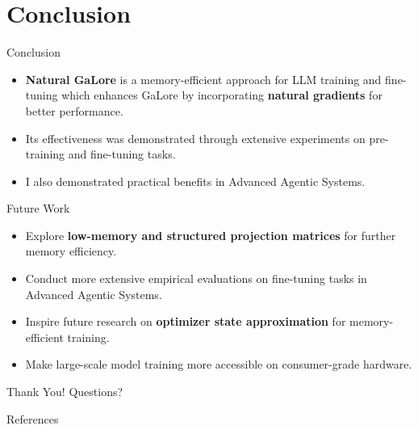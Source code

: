 \documentclass{beamer}
\begin{document}
\section{Conclusion}

\begin{frame}{Conclusion}
    \begin{itemize}
        \item \textbf{Natural GaLore} is a memory-efficient approach for LLM training and fine-tuning which enhances GaLore by incorporating \textbf{natural gradients} for better performance.
        \item Its effectiveness was demonstrated through extensive experiments on pre-training and fine-tuning tasks.
        \item I also demonstrated practical benefits in Advanced Agentic Systems.
    \end{itemize}
\end{frame}

\begin{frame}{Future Work}
    \begin{itemize}
        \item Explore \textbf{low-memory and structured projection matrices} for further memory efficiency.
        \item Conduct more extensive empirical evaluations on fine-tuning tasks in Advanced Agentic Systems.
        \item Inspire future research on \textbf{optimizer state approximation} for memory-efficient training.
        \item Make large-scale model training more accessible on consumer-grade hardware.
    \end{itemize}
\end{frame}

\begin{frame}{}
    \begin{center}
        Thank You! Questions?
    \end{center}
\end{frame}

\begin{frame}[allowframebreaks]{References}
    \small
    
    
\end{frame}
\end{document}
